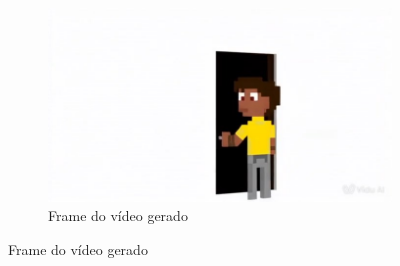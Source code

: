 \begin{figure}[htbp]
    \begin{subfigure}{0.55\linewidth}
        \includegraphics[width=1\linewidth]{figs/vidu/frame12.jpg}
        \caption{\small Frame do vídeo gerado}
        \label{fig:vidu12b}
    \end{subfigure}
\end{figure}

